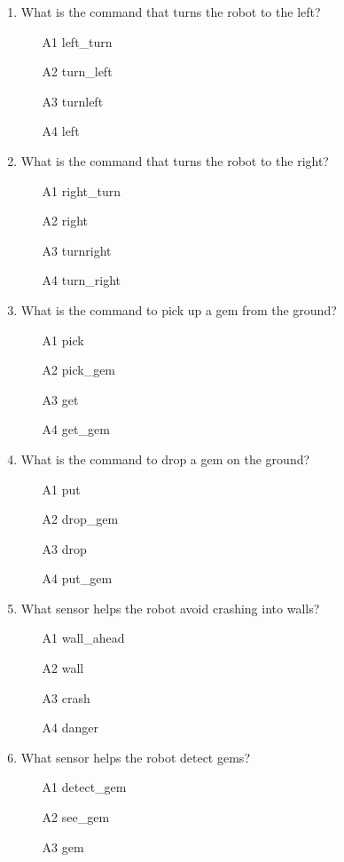 \documentclass[article,A4,12pt]{llncs}
\begin{document}
\begin{enumerate}
\begin{enumerate}
\end{enumerate}
\item What is the command that turns the robot to the left?
\begin{enumerate}
\item[A1] left\_turn
\item[A2] turn\_left
\item[A3] turnleft
\item[A4] left
\end{enumerate}
\item What is the command that turns the robot to the right?
\begin{enumerate}
\item[A1] right\_turn
\item[A2] right
\item[A3] turnright
\item[A4] turn\_right
\end{enumerate}
\item What is the command to pick up a gem from the ground?
\begin{enumerate}
\item[A1] pick
\item[A2] pick\_gem
\item[A3] get
\item[A4] get\_gem
\end{enumerate}
\item What is the command to drop a gem on the ground?
\begin{enumerate}
\item[A1] put
\item[A2] drop\_gem
\item[A3] drop 
\item[A4] put\_gem
\end{enumerate}
\item What sensor helps the robot avoid crashing into walls?
\begin{enumerate}
\item[A1] wall\_ahead
\item[A2] wall
\item[A3] crash
\item[A4] danger
\end{enumerate}
\item What sensor helps the robot detect gems?
\begin{enumerate}
\item[A1] detect\_gem
\item[A2] see\_gem
\item[A3] gem

\end{enumerate}
\end{enumerate}
\end{document}
